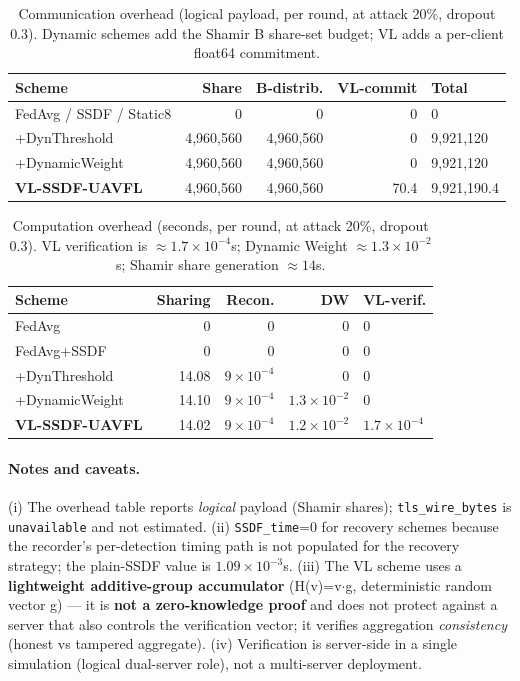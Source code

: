 \documentclass[10pt,conference]{IEEEtran}
\begin{document}
\begin{table}[t]
\caption{Communication overhead (logical payload, per round, at attack 20\%, dropout 0.3). Dynamic schemes add the Shamir B share-set budget; VL adds a per-client float64 commitment.}
\label{tab:comm}
\centering
\small
\begin{tabular}{lrrr}
\toprule
Scheme & Share & B-distrib. & VL-commit & Total\\
\midrule
FedAvg / SSDF / Static8 & 0 & 0 & 0 & 0\\
+DynThreshold & 4{,}960{,}560 & 4{,}960{,}560 & 0 & 9{,}921{,}120\\
+DynamicWeight & 4{,}960{,}560 & 4{,}960{,}560 & 0 & 9{,}921{,}120\\
\textbf{VL-SSDF-UAVFL} & 4{,}960{,}560 & 4{,}960{,}560 & 70.4 & 9{,}921{,}190.4\\
\bottomrule
\end{tabular}
\end{table}

\begin{table}[t]
\caption{Computation overhead (seconds, per round, at attack 20\%, dropout 0.3). VL verification is $\approx 1.7\times10^{-4}$s; Dynamic Weight $\approx 1.3\times10^{-2}$s; Shamir share generation $\approx 14$s.}
\label{tab:comp}
\centering
\small
\begin{tabular}{lrrr}
\toprule
Scheme & Sharing & Recon. & DW & VL-verif.\\
\midrule
FedAvg & 0 & 0 & 0 & 0\\
FedAvg+SSDF & 0 & 0 & 0 & 0\\
+DynThreshold & 14.08 & $9\times10^{-4}$ & 0 & 0\\
+DynamicWeight & 14.10 & $9\times10^{-4}$ & $1.3\times10^{-2}$ & 0\\
\textbf{VL-SSDF-UAVFL} & 14.02 & $9\times10^{-4}$ & $1.2\times10^{-2}$ & $1.7\times10^{-4}$\\
\bottomrule
\end{tabular}
\end{table}

\paragraph{Notes and caveats.} (i) The overhead table reports \emph{logical} payload (Shamir shares); \texttt{tls\_wire\_bytes} is \texttt{unavailable} and not estimated. (ii) \texttt{SSDF\_time}=0 for recovery schemes because the recorder's per-detection timing path is not populated for the recovery strategy; the plain-SSDF value is $1.09\times10^{-3}$s. (iii) The VL scheme uses a \textbf{lightweight additive-group accumulator} (H(v)=v$\cdot$g, deterministic random vector g) --- it is \textbf{not a zero-knowledge proof} and does not protect against a server that also controls the verification vector; it verifies aggregation \emph{consistency} (honest vs tampered aggregate). (iv) Verification is server-side in a single simulation (logical dual-server role), not a multi-server deployment.
\end{document}
